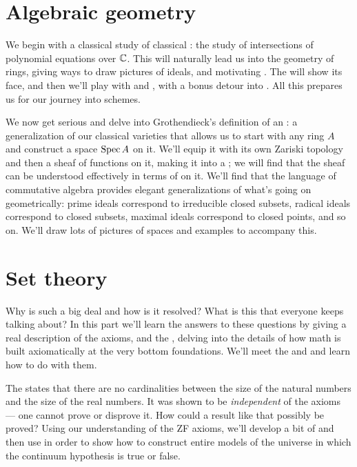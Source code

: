 \section{Algebraic geometry}
\begin{itemize}
We begin with a classical study of classical :
the study of intersections of polynomial equations over $\mathbb C$.
This will naturally lead us into the geometry of rings,
giving ways to draw pictures of ideals,
and motivating .
The  will show its face,
and then we'll play with 
and ,
with a bonus detour into .
All this prepares us for our journey into schemes.

We now get serious and delve into Grothendieck's definition of
an :
a generalization of our classical varieties
that allows us to start with any ring $A$
and construct a space $\operatorname{Spec} A$ on it.
We'll equip it with its own Zariski topology
and then a sheaf of functions on it,
making it into a ;
we will find that the sheaf can be understood
effectively in terms of  on it.
We'll find that the language of commutative algebra provides
elegant generalizations of what's going on geometrically:
prime ideals correspond to irreducible closed subsets,
radical ideals correspond to closed subsets,
maximal ideals correspond to closed points, and so on.
We'll draw lots of pictures of spaces and examples to accompany this.
\end{itemize}

\section{Set theory}
\begin{itemize}
Why is  such a big deal
and how is it resolved?
What is this 
that everyone keeps talking about?
In this part we'll learn the answers to these questions
by giving a real description of the 
axioms, and the ,
delving into the details of how math is built axiomatically
at the very bottom foundations.
We'll meet the  and 
and learn how to do  with them.

The 
states that there are no cardinalities
between the size of the natural numbers and the size of the real numbers.
It was shown to be \emph{independent} of the axioms ---
one cannot prove or disprove it.
How could a result like that possibly be proved?
Using our understanding of the ZF axioms,
we'll develop a bit of 
and then use  in order to show
how to construct entire models of the universe
in which the continuum hypothesis is true or false.
\end{itemize}
